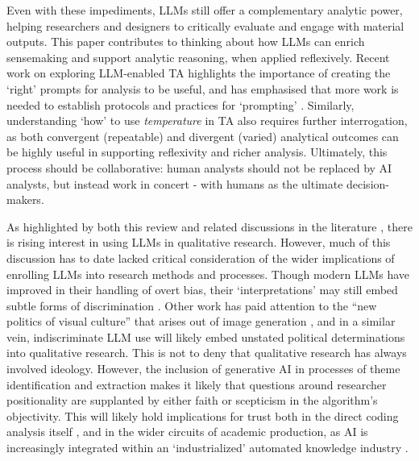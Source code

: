 \documentclass{article}
\begin{document}
Even with these impediments, LLMs still offer a complementary analytic power, helping researchers and designers to critically evaluate and engage with material outputs. This paper contributes to thinking about how LLMs can enrich sensemaking and support analytic reasoning, when applied reflexively. Recent work on exploring LLM-enabled TA highlights the importance of creating the `right' prompts \cite{depaoliPerformingInductiveThematic2023, xiaoSupportingQualitativeAnalysis2023} for analysis to be useful, and has emphasised that more work is needed to establish protocols and practices for `prompting' \cite{depaoliPerformingInductiveThematic2023}. Similarly, understanding `how' to use \textit{temperature} \cite{depaoliPerformingInductiveThematic2023} in TA also requires further interrogation, as both convergent (repeatable) and divergent (varied) analytical outcomes can be highly useful in supporting reflexivity and richer analysis. Ultimately, this process should be collaborative: human analysts should not be replaced by AI analysts, but instead work in concert \cite{depaoliPerformingInductiveThematic2023, gaoCollabCoderLowerbarrierRigorous2024, jiangSupportingSerendipityOpportunities2021} - with humans as the ultimate decision-makers.

As highlighted by both this review and related discussions in the literature \cite{depaoliPerformingInductiveThematic2023, zhang2023redefining}, there is rising interest in using LLMs in qualitative research. However, much of this discussion has to date lacked critical consideration of the wider implications of enrolling LLMs into research methods and processes. Though modern LLMs have improved in their handling of overt bias, their `interpretations' may still embed subtle forms of discrimination \cite{mageeIntersectionalBiasCausal2021}. Other work has paid attention to the ``new politics of visual culture'' that arises out of image generation \cite{offert2022sign}, and in a similar vein, indiscriminate LLM use will likely embed unstated political determinations into qualitative research. This is not to deny that qualitative research has always involved ideology. However, the inclusion of generative AI in processes of theme identification and extraction makes it likely that questions around researcher positionality are supplanted by either faith or scepticism in the algorithm's objectivity. This will likely hold implications for trust both in the direct coding analysis itself \cite{depaoliPerformingInductiveThematic2023}, and in the wider circuits of academic production, as AI is increasingly integrated within an `industrialized' automated knowledge industry \cite{van2024big}.
\end{document}
